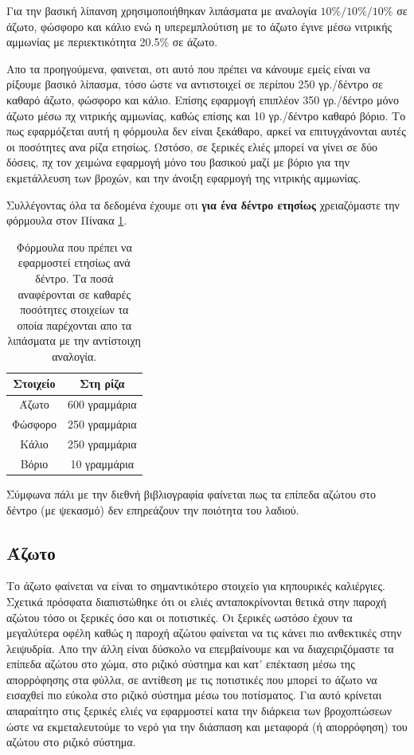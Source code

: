 \documentclass[12pt,a4paper]{article}
\begin{document}
Για την βασική λίπανση χρησιμοποιήθηκαν λιπάσματα με αναλογία $10\%/10\%/10\%$ σε άζωτο, φώσφορο και κάλιο ενώ η υπερεμπλούτιση με το άζωτο έγινε μέσω νιτρικής αμμωνίας με περιεκτικότητα 20.5$\%$ σε άζωτο.

Απο τα προηγούμενα, φαινεται, οτι αυτό που πρέπει να κάνουμε εμείς είναι να ρίξουμε βασικό λίπασμα, τόσο ώστε να αντιστοιχεί σε περίπου 250 γρ./δέντρο σε καθαρό άζωτο, φώσφορο και κάλιο. Επίσης εφαρμογή επιπλέον 350 γρ./δέντρο μόνο άζωτο μέσω πχ νιτρικής αμμωνίας, καθώς επίσης και 10 γρ./δέντρο καθαρό βόριο. Το πως εφαρμόζεται αυτή η φόρμουλα δεν είναι ξεκάθαρο, αρκεί να επιτυγχάνονται αυτές οι ποσότητες ανα ρίζα ετησίως. Ωστόσο, σε ξερικές ελιές μπορεί να γίνει σε δύο δόσεις, πχ τον χειμώνα εφαρμογή μόνο του βασικού μαζί με βόριο για την εκμετάλλευση των βροχών, και την άνοιξη εφαρμογή της νιτρικής αμμωνίας.

Συλλέγοντας όλα τα δεδομένα έχουμε οτι \textbf{για ένα δέντρο ετησίως} χρειαζόμαστε την φόρμουλα στον Πίνακα \ref{tab:formula}.
\begin{table}[ht!]
	\centering
	\begin{tabular}{|c|c|}
		\hline
		\textbf{Στοιχείο} & \textbf{Στη ρίζα}\\
		\hline 
		\hline
		Άζωτο &  600 γραμμάρια \\ 
		\hline 
		Φώσφορο &  250 γραμμάρια \\ 
			\hline 
		Κάλιο &  250 γραμμάρια \\ 
		\hline 
		Βόριο &  10 γραμμάρια\\ 
		\hline 
	\end{tabular} 
\caption{Φόρμουλα που πρέπει να εφαρμοστεί ετησίως ανά δέντρο. Τα ποσά αναφέρονται σε καθαρές ποσότητες στοιχείων τα οποία παρέχονται απο τα λιπάσματα με την αντίστοιχη αναλογία.}\label{tab:formula}
\end{table}

Σύμφωνα πάλι με την διεθνή βιβλιογραφία φαίνεται πως τα επίπεδα αζώτου στο δέντρο (με ψεκασμό) δεν επηρεάζουν την ποιότητα του λαδιού. 

\subsection{Άζωτο}
Το άζωτο φαίνεται να είναι το σημαντικότερο στοιχείο για κηπουρικές καλιέργιες.  Σχετικά πρόσφατα διαπιστώθηκε ότι οι ελιές ανταποκρίνονται θετικά στην παροχή αζώτου τόσο οι ξερικές όσο και οι ποτιστικές. Οι ξερικές ωστόσο έχουν τα μεγαλύτερα οφέλη καθώς η παροχή αζώτου φαίνεται να τις κάνει πιο ανθεκτικές στην λειψυδρία. Απο την άλλη είναι δύσκολο να επεμβαίνουμε και να διαχειριζόμαστε τα επίπεδα αζώτου στο χώμα, στο ριζικό σύστημα και κατ' επέκταση μέσω της απορρόφησης στα φύλλα, σε αντίθεση με τις ποτιστικές που μπορεί το άζωτο να εισαχθεί πιο εύκολα στο ριζικό σύστημα μέσω του ποτίσματος. Για αυτό κρίνεται απαραίτητο στις ξερικές ελιές να εφαρμοστεί κατα την διάρκεια των βροχοπτώσεων ώστε να εκμεταλευτούμε το νερό για την διάσπαση και μεταφορά (ή απορρόφηση) του αζώτου στο ριζικό σύστημα. 
\end{document}
